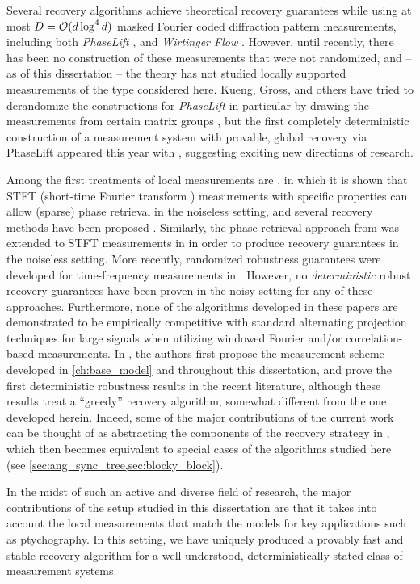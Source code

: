 Several recovery algorithms achieve theoretical recovery guarantees while using at most $D = \mathcal{O}(d \log^4 d)$ masked Fourier coded diffraction pattern measurements, including both {\em PhaseLift} \cite{Candes2014WF,gross2015improved}, and {\em Wirtinger Flow} \cite{candes2015wtf}.  However, until recently, there has been no construction of these measurements that were not randomized, and -- as of this dissertation -- the theory has not studied locally supported measurements of the type considered here.  Kueng, Gross, and others have tried to derandomize the constructions for \emph{PhaseLift} in particular by drawing the measurements from certain matrix groups \cite{kueng2015spherical,kueng2016clifford}, but the first completely deterministic construction of a measurement system with provable, global recovery via PhaseLift appeared this year with \cite{kech2018explicit}, suggesting exciting new directions of research.

Among the first treatments of local measurements are \cite{bendory2017stft,eldar2014sparse,jaganathan2016stft}, in which it is shown that STFT (short-time Fourier transform \cite{allen1977stft,portnoff1979stft}) measurements with specific properties can allow (sparse) phase retrieval in the noiseless setting, and several recovery methods have been proposed \cite{bendory2018stft,guo2018stft}.  Similarly, the phase retrieval approach from \cite{alexeev2014phase} was extended to STFT measurements in \cite{salanevich2015polarization} in order to produce recovery guarantees in the noiseless setting.  More recently, randomized robustness guarantees were developed for time-frequency measurements in \cite{salanevich2016polarization}.  However, no {\it deterministic} robust recovery guarantees have been proven in the noisy setting for any of these approaches.  Furthermore, none of the algorithms developed in these papers are demonstrated to be empirically competitive with standard alternating projection techniques for large signals when utilizing windowed Fourier and/or correlation-based measurements.  In \cite{IVW2015_FastPhase}, the authors first propose the measurement scheme developed in \cref{ch:base_model} and throughout this dissertation, and prove the first deterministic robustness results in the recent literature, although these results treat a ``greedy'' recovery algorithm, somewhat different from the one developed herein.  Indeed, some of the major contributions of the current work can be thought of as abstracting the components of the recovery strategy in \cite{IVW2015_FastPhase}, which then becomes equivalent to special cases of the algorithms studied here (see \cref{sec:ang_sync_tree,sec:blocky_block}).

In the midst of such an active and diverse field of research, the major contributions of the setup studied in this dissertation are that it takes into account the local measurements that match the models for key applications such as ptychography.  In this setting, we have uniquely produced a provably fast and stable recovery algorithm for a well-understood, deterministically stated class of measurement systems.
